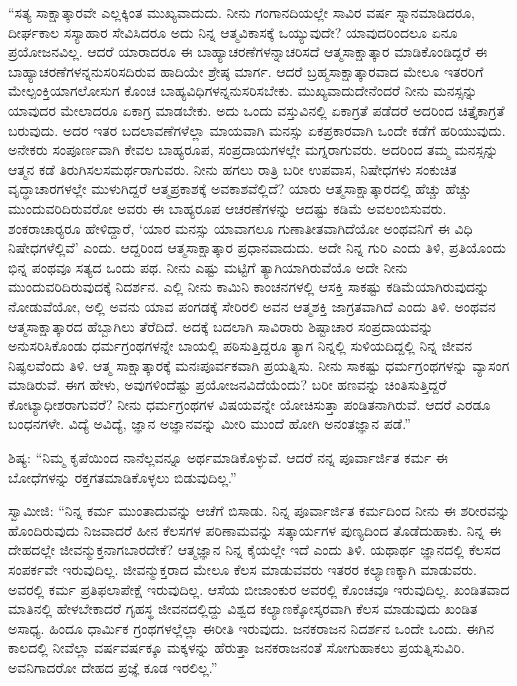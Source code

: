  “ಸತ್ಯ ಸಾಕ್ಷಾತ್ಕಾರವೇ ಎಲ್ಲಕ್ಕಿಂತ ಮುಖ್ಯವಾದುದು. ನೀನು ಗಂಗಾನದಿಯಲ್ಲೇ ಸಾವಿರ ವರ್ಷ ಸ್ನಾನಮಾಡಿದರೂ, ದೀರ್ಘಕಾಲ ಸಸ್ಯಾಹಾರ ಸೇವಿಸಿದರೂ ಅದು ನಿನ್ನ ಆತ್ಮವಿಕಾಸಕ್ಕೆ ಒಯ್ಯುವುದೇ? ಯಾವುದರಿಂದಲೂ ಏನೂ ಪ್ರಯೋಜನವಿಲ್ಲ. ಆದರೆ ಯಾರಾದರೂ ಈ ಬಾಹ್ಯಾಚರಣೆಗಳನ್ನಾಚರಿಸದೆ ಆತ್ಮಸಾಕ್ಷಾತ್ಕಾರ ಮಾಡಿಕೊಂಡಿದ್ದರೆ ಈ ಬಾಹ್ಯಾಚರಣೆಗಳನ್ನನುಸರಿಸದಿರುವ ಹಾದಿಯೇ ಶ್ರೇಷ್ಠ ಮಾರ್ಗ. ಆದರೆ ಬ್ರಹ್ಮಸಾಕ್ಷಾತ್ಕಾರವಾದ ಮೇಲೂ ಇತರರಿಗೆ ಮೇಲ್ಪಂಕ್ತಿಯಾಗಲೋಸುಗ ಕೊಂಚ ಬಾಹ್ಯವಿಧಿಗಳನ್ನನುಸರಿಸಬೇಕು. ಮುಖ್ಯವಾದುದೇನೆಂದರೆ ನೀನು ಮನಸ್ಸನ್ನು ಯಾವುದರ ಮೇಲಾದರೂ ಏಕಾಗ್ರ ಮಾಡಬೇಕು. ಅದು ಒಂದು ವಸ್ತುವಿನಲ್ಲಿ ಏಕಾಗ್ರತೆ ಪಡೆದರೆ ಅದರಿಂದ ಚಿತ್ತೈಕಾಗ್ರತೆ ಬರುವುದು. ಅದರ ಇತರ ಬದಲಾವಣೆಗಳೆಲ್ಲಾ ಮಾಯವಾಗಿ ಮನಸ್ಸು ಏಕಪ್ರಕಾರವಾಗಿ ಒಂದೇ ಕಡೆಗೆ ಹರಿಯುವುದು. ಅನೇಕರು ಸಂಪೂರ್ಣವಾಗಿ ಕೇವಲ ಬಾಹ್ಯರೂಪ, ಸಂಪ್ರದಾಯಗಳಲ್ಲೇ ಮಗ್ನರಾಗುವರು. ಅದರಿಂದ ತಮ್ಮ ಮನಸ್ಸನ್ನು ಆತ್ಮನ ಕಡೆ ತಿರುಗಿಸಲಸಮರ್ಥರಾಗುವರು. ನೀನು ಹಗಲು ರಾತ್ರಿ ಬರೀ ಉಪವಾಸ, ನಿಷೇಧಗಳು ಸಂಕುಚಿತ ವೃದ್ಧಾಚಾರಗಳಲ್ಲೇ ಮುಳುಗಿದ್ದರೆ ಆತ್ಮಪ್ರಕಾಶಕ್ಕೆ ಅವಕಾಶವೆಲ್ಲಿದೆ? ಯಾರು ಆತ್ಮಸಾಕ್ಷಾತ್ಕಾರದಲ್ಲಿ ಹೆಚ್ಚು ಹೆಚ್ಚು ಮುಂದುವರಿದಿರುವರೋ ಅವರು ಈ ಬಾಹ್ಯರೂಪ ಆಚರಣೆಗಳನ್ನು ಆದಷ್ಟು ಕಡಿಮೆ ಅವಲಂಬಿಸುವರು. ಶಂಕರಾಚಾರ‍್ಯರೂ‌ ಹೇಳಿದ್ದಾರೆ, ‘ಯಾರ ಮನಸ್ಸು ಯಾವಾಗಲೂ ಗುಣಾತೀತವಾಗಿದೆಯೋ ಅಂಥವನಿಗೆ ಈ ವಿಧಿ ನಿಷೇಧಗಳೆಲ್ಲಿವೆ’ ಎಂದು. ಆದ್ದರಿಂದ ಆತ್ಮಸಾಕ್ಷಾತ್ಕಾರ ಪ್ರಧಾನವಾದುದು. ಅದೇ ನಿನ್ನ ಗುರಿ ಎಂದು ತಿಳಿ, ಪ್ರತಿಯೊಂದು ಭಿನ್ನ ಪಂಥವೂ ಸತ್ಯದ ಒಂದು ಪಥ. ನೀನು ಎಷ್ಟು ಮಟ್ಟಿಗೆ ತ್ಯಾಗಿಯಾಗಿರುವೆಯೊ ಅದೇ ನೀನು ಮುಂದುವರಿದಿರುವುದಕ್ಕೆ ನಿದರ್ಶನ. ಎಲ್ಲಿ ನೀನು ಕಾಮಿನಿ ಕಾಂಚನಗಳಲ್ಲಿ ಆಸಕ್ತಿ ಸಾಕಷ್ಟು ಕಡಿಮೆಯಾಗಿರುವುದನ್ನು ನೋಡುವೆಯೋ, ಅಲ್ಲಿ ಅವನು ಯಾವ ಪಂಗಡಕ್ಕೆ ಸೇರಿರಲಿ ಅವನ ಆತ್ಮಶಕ್ತಿ ಜಾಗ್ರತವಾಗಿದೆ ಎಂದು ತಿಳಿ. ಅಂಥವನ ಆತ್ಮಸಾಕ್ಷಾತ್ಕಾರದ ಹೆಬ್ಬಾಗಿಲು ತೆರೆದಿದೆ. ಅದಕ್ಕೆ ಬದಲಾಗಿ ಸಾವಿರಾರು ಶಿಷ್ಟಾಚಾರ ಸಂಪ್ರದಾಯವನ್ನು ಅನುಸರಿಸಿಕೊಂಡು ಧರ್ಮಗ್ರಂಥಗಳನ್ನೇ ಬಾಯಲ್ಲಿ ಪಠಿಸುತ್ತಿದ್ದರೂ ತ್ಯಾಗ ನಿನ್ನಲ್ಲಿ ಸುಳಿಯದಿದ್ದಲ್ಲಿ ನಿನ್ನ ಜೀವನ ನಿಷ್ಫಲವೆಂದು ತಿಳಿ. ಆತ್ಮ ಸಾಕ್ಷಾತ್ಕಾರಕ್ಕೆ ಮನಃಪೂರ್ವಕವಾಗಿ ಪ್ರಯತ್ನಿಸು. ನೀನು ಸಾಕಷ್ಟು ಧರ್ಮಗ್ರಂಥಗಳನ್ನು ವ್ಯಾಸಂಗ ಮಾಡಿರುವೆ. ಈಗ ಹೇಳು, ಅವುಗಳಿಂದೆಷ್ಟು ಪ್ರಯೋಜನವಿದೆಯೆಂದು? ಬರೀ ಹಣವನ್ನು ಚಿಂತಿಸುತ್ತಿದ್ದರೆ ಕೋಟ್ಯಾಧೀಶರಾಗುವರೆ? ನೀನು ಧರ್ಮಗ್ರಂಥಗಳ ವಿಷಯವನ್ನೇ ಯೋಚಿಸುತ್ತಾ ಪಂಡಿತನಾಗಿರುವೆ. ಆದರೆ ಎರಡೂ ಬಂಧನಗಳೇ. ವಿದ್ಯೆ ಅವಿದ್ಯೆ, ಜ್ಞಾನ ಅಜ್ಞಾನವನ್ನು ಮೀರಿ ಮುಂದೆ ಹೋಗಿ ಅನಂತಜ್ಞಾನ ಪಡೆ.” 

 ಶಿಷ್ಯ: “ನಿಮ್ಮ ಕೃಪೆಯಿಂದ ನಾನೆಲ್ಲವನ್ನೂ ಅರ್ಥಮಾಡಿಕೊಳ್ಳುವೆ. ಆದರೆ ನನ್ನ ಪೂರ್ವಾರ್ಜಿತ ಕರ್ಮ ಈ ಬೋಧೆಗಳನ್ನು ರಕ್ತಗತಮಾಡಿಕೊಳ್ಳಲು ಬಿಡುವುದಿಲ್ಲ.” 

 ಸ್ವಾಮೀಜಿ: “ನಿನ್ನ ಕರ್ಮ ಮುಂತಾದುವನ್ನು ಆಚೆಗೆ ಬಿಸಾಡು. ನಿನ್ನ ಪೂರ್ವಾರ್ಜಿತ ಕರ್ಮದಿಂದ ನೀನು ಈ ಶರೀರವನ್ನು ಹೊಂದಿರುವುದು ನಿಜವಾದರೆ ಹೀನ ಕೆಲಸಗಳ ಪರಿಣಾಮವನ್ನು ಸತ್ಕಾರ್ಯಗಳ ಪುಣ್ಯದಿಂದ ತೊಡೆದುಹಾಕು. ನಿನ್ನ ಈ ದೇಹದಲ್ಲೇ ಜೀವನ್ಮುಕ್ತನಾಗಬಾರದೇಕೆ? ಆತ್ಮಜ್ಞಾನ ನಿನ್ನ ಕೈಯಲ್ಲೇ ಇದೆ ಎಂದು ತಿಳಿ. ಯಥಾರ್ಥ ಜ್ಞಾನದಲ್ಲಿ ಕೆಲಸದ ಸಂಪರ್ಕವೇ ಇರುವುದಿಲ್ಲ. ಜೀವನ್ಮುಕ್ತರಾದ ಮೇಲೂ ಕೆಲಸ ಮಾಡುವವರು ಇತರರ ಕಲ್ಯಾಣಕ್ಕಾಗಿ ಮಾಡುವರು. ಅವರಲ್ಲಿ ಕರ್ಮ ಪ್ರತಿಫಲಾಪೇಕ್ಷೆ ಇರುವುದಿಲ್ಲ. ಆಸೆಯ ಬೀಜಾಂಕುರ ಅವರಲ್ಲಿ ಕೊಂಚವೂ ಇರುವುದಿಲ್ಲ. ಖಂಡಿತವಾದ ಮಾತಿನಲ್ಲಿ ಹೇಳಬೇಕಾದರೆ ಗೃಹಸ್ಥ ಜೀವನದಲ್ಲಿದ್ದು ವಿಶ್ವದ ಕಲ್ಯಾಣಕ್ಕೋಸ್ಕರವಾಗಿ ಕೆಲಸ ಮಾಡುವುದು ಖಂಡಿತ ಅಸಾಧ್ಯ. ಹಿಂದೂ ಧಾರ್ಮಿಕ ಗ್ರಂಥಗಳಲ್ಲೆಲ್ಲಾ ಈ‌ರೀತಿ ಇರುವುದು. ಜನಕರಾಜನ ನಿದರ್ಶನ ಒಂದೇ ಒಂದು. ಈಗಿನ ಕಾಲದಲ್ಲಿ ನೀವೆಲ್ಲಾ ವರ್ಷವರ್ಷಕ್ಕೂ ಮಕ್ಕಳನ್ನು ಹೆರುತ್ತಾ ಜನಕರಾಜನಂತೆ ಸೋಗುಹಾಕಲು ಪ್ರಯತ್ನಿಸುವಿರಿ. ಅವನಿಗಾದರೋ ದೇಹದ ಪ್ರಜ್ಞೆ ಕೂಡ ಇರಲಿಲ್ಲ.” 

